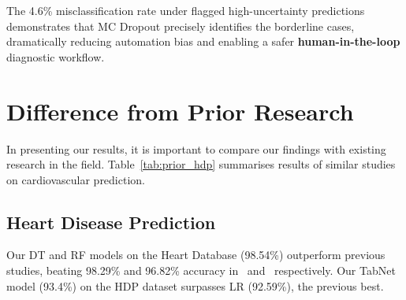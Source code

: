 \documentclass[10pt, twocolumn]{article}
\begin{document}
The 4.6\% misclassification rate under flagged high-uncertainty predictions demonstrates
that MC Dropout precisely identifies the borderline cases, dramatically reducing automation
bias and enabling a safer \textbf{human-in-the-loop} diagnostic workflow.

\section{Difference from Prior Research}

In presenting our results, it is important to compare our findings with existing research
in the field.
Table~\ref{tab:prior_hdp} summarises results of similar studies on cardiovascular prediction.

\subsection{Heart Disease Prediction}

Our DT and RF models on the Heart Database (98.54\%) outperform previous studies, beating
98.29\% and 96.82\% accuracy in~\cite{agrahary2020} and~\cite{anbuselvan2020} respectively.
Our TabNet model (93.4\%) on the HDP dataset surpasses LR (92.59\%), the previous best.

\begin{table}[H]
\centering
\caption{Similar Studies Results -- Heart Disease Prediction.}
\label{tab:prior_hdp}
\end{table}
\end{document}
